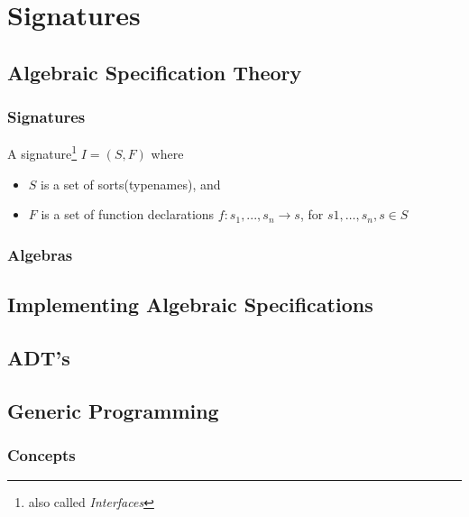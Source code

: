 \chapter{Signatures}

\section{Algebraic Specification Theory}
\subsection{Signatures}
A signature\footnote{also called \textit{Interfaces}} $I = (S,F)$ where
\begin{itemize}
    \item $S$ is a set of sorts(typenames), and
    \item $F$ is a set of function declarations $f: s_1, ..., s_n \rightarrow s$, for $s1, \dots, s_n, s \in S$
\end{itemize}


\subsection{Algebras}

\section{Implementing Algebraic Specifications}

\section{ADT's}

\section{Generic Programming}
\subsection{Concepts}